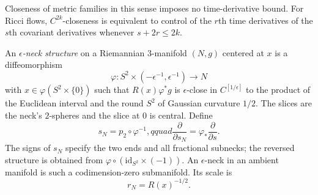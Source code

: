 \begin{remark}
\label{rem:ricci-flow-metric-topology}

Closeness of metric families in this sense imposes no time-derivative
bound. For Ricci flows, $C^{2k}$-closeness is equivalent to control of
the $r$th time derivatives of the $s$th covariant derivatives whenever
$s+2r\le2k$.
\end{remark}

\begin{definition}
\label{def:epsilon-neck}
\leanok
\label{epsneck}

An \emph{$\epsilon$-neck structure} on a Riemannian $3$-manifold
$(N,g)$ centered at $x$ is a diffeomorphism
$$\varphi\colon S^2\times(-\epsilon^{-1},\epsilon^{-1})\to N$$
with $x\in\varphi(S^2\times\{0\})$ such that
$R(x)\varphi^*g$ is $\epsilon$-close in $C^{[1/\epsilon]}$ to the
product of the Euclidean interval and the round $S^2$ of Gaussian
curvature $1/2$. The slices are the neck's $2$-spheres and the slice at
$0$ is central. Define
$$s_N=p_2\circ\varphi^{-1},qquad
\frac{\partial}{\partial s_N}=\varphi_*\frac{\partial}{\partial s}.$$
The signs of $s_N$ specify the two ends and all fractional subnecks; the
reversed structure is obtained from
$\varphi\circ(\mathrm{id}_{S^2}\times(-1))$. An $\epsilon$-neck in an
ambient manifold is such a codimension-zero submanifold. Its scale is
$$r_N=R(x)^{-1/2}.$$
\end{definition}

